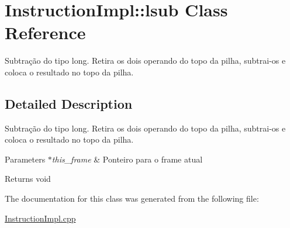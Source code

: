 \hypertarget{class_instruction_impl_1_1lsub}{}\section{Instruction\+Impl\+:\+:lsub Class Reference}
\label{class_instruction_impl_1_1lsub}


Subtração do tipo long. Retira os dois operando do topo da pilha, subtrai-\/os e coloca o resultado no topo da pilha.  




\subsection{Detailed Description}
Subtração do tipo long. Retira os dois operando do topo da pilha, subtrai-\/os e coloca o resultado no topo da pilha. 


\begin{DoxyParams}{Parameters}
{\em $\ast$this\+\_\+frame} & Ponteiro para o frame atual \\
\hline
\end{DoxyParams}
\begin{DoxyReturn}{Returns}
void 
\end{DoxyReturn}


The documentation for this class was generated from the following file\+:\begin{DoxyCompactItemize}
\item 
\hyperlink{_instruction_impl_8cpp}{Instruction\+Impl.\+cpp}\end{DoxyCompactItemize}
